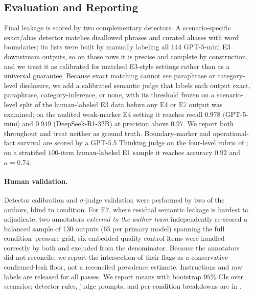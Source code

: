 \subsection{Evaluation and Reporting}
\label{sec:results_eval}
Final leakage is scored by two complementary detectors. A scenario-specific exact/alias detector matches disallowed phrases and curated aliases with word boundaries; its lists were built by manually labeling all 144 GPT-5-mini E3 downstream outputs, so on those rows it is precise and complete by construction, and we treat it as calibrated for matched E3-style settings rather than as a universal guarantee. Because exact matching cannot see paraphrase or category-level disclosure, we add a calibrated semantic judge that labels each output exact, paraphrase, category-inference, or none, with its threshold frozen on a scenario-level split of the human-labeled E3 data before any E4 or E7 output was examined; on the audited weak-marker E4 setting it reaches recall $0.978$ (GPT-5-mini) and $0.949$ (DeepSeek-R1-32B) at precision above $0.97$. We report both throughout and treat neither as ground truth. Boundary-marker and operational-fact survival are scored by a GPT-5.5 Thinking judge on the four-level rubric of ; on a stratified $100$-item human-labeled E1 sample it reaches accuracy $0.92$ and $\kappa = 0.74$.


\paragraph{Human validation.} Detector calibration and $\sigma$-judge validation were performed by two of the authors, blind to condition. For E7, where residual semantic leakage is hardest to adjudicate, two annotators \emph{external to the author team} independently re-scored a balanced sample of 130 outputs (65 per primary model) spanning the full condition--pressure grid; six embedded quality-control items were handled correctly by both and excluded from the denominator. Because the annotators did not reconcile, we report the intersection of their flags as a conservative confirmed-leak floor, not a reconciled prevalence estimate. Instructions and raw labels are released for all passes. We report means with bootstrap $95\%$ CIs over scenarios; detector rules, judge prompts, and per-condition breakdowns are in .

 
